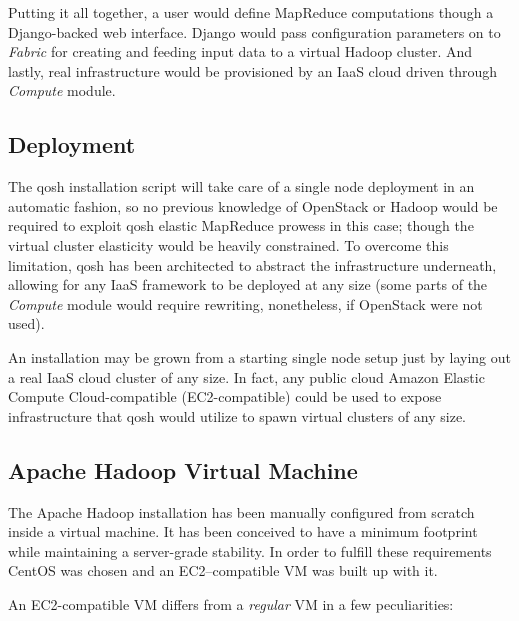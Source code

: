 \documentclass[conference]{IEEEtran}
\begin{document}
Putting it all together, a user would define MapReduce computations though a Django-backed web interface. Django would pass configuration parameters on to \emph{Fabric} for creating and feeding input data to a virtual Hadoop cluster. And lastly, real infrastructure would be provisioned by an IaaS cloud driven through \emph{Compute} module.


\subsection{Deployment}
\noindent The qosh installation script will take care of a single node deployment in an automatic fashion, so no previous knowledge of OpenStack or Hadoop would be required to exploit qosh elastic MapReduce prowess in this case; though the virtual cluster elasticity would be heavily constrained. To overcome this limitation, qosh has been architected to abstract the infrastructure underneath, allowing for any IaaS framework to be deployed at any size (some parts of the \emph{Compute} module would require rewriting, nonetheless, if OpenStack were not used).

An installation may be grown from a starting single node setup just by laying out a real IaaS cloud cluster of any size. In fact, any public cloud Amazon Elastic Compute Cloud-compatible (EC2-compatible) could be used to expose infrastructure that qosh would utilize to spawn virtual clusters of any size.


\subsection{Apache Hadoop Virtual Machine}\label{subsec:hadvm}
\noindent The Apache Hadoop installation has been manually configured from scratch inside a virtual machine. It has been conceived to have a minimum footprint while maintaining a server-grade stability. In order to fulfill these requirements CentOS was chosen and an EC2--compatible VM was built up with it.

An EC2-compatible VM differs from a \emph{regular} VM in a few peculiarities:
\end{document}
